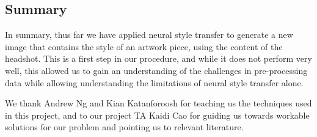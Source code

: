 \documentclass{pnastwo2}
\begin{document}
\begin{article}
\section{Summary}

In summary, thus far we have applied neural style transfer to generate a new image that contains the style of an artwork piece, using the content of the headshot. This is a first step in our procedure, and while it does not perform very well, this allowed us to gain an understanding of the challenges in pre-processing data while allowing understanding the limitations of neural style transfer alone. 


\begin{acknowledgments}
We thank Andrew Ng and Kian Katanforoosh for teaching us the techniques used in this project, and to our project TA Kaidi Cao for guiding us towards workable solutions for our problem and pointing us to relevant literature.
\end{acknowledgments}




\end{article}
\end{document}
